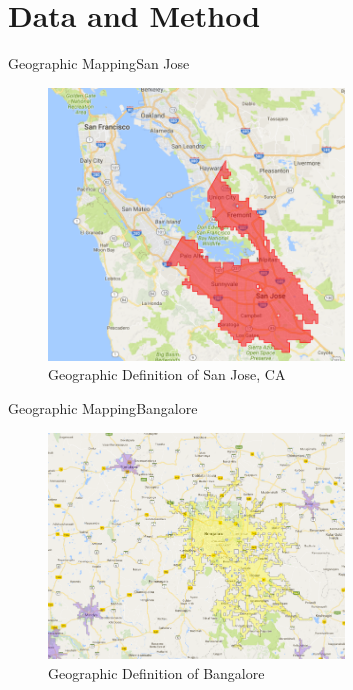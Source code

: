 \documentclass{beamer}
\begin{document}
\section{Data and Method}
\begin{frame}{Geographic Mapping}{San Jose}
\begin{figure}[h!]
\begin{centering}
  \includegraphics[width=0.7\textwidth]{SanJose}
  \caption{Geographic Definition of San Jose, CA}
   \label{fig:SanJose}
\end{centering}
\end{figure}
\end{frame}

\begin{frame}{Geographic Mapping}{Bangalore}
\begin{figure}[h!]
\begin{centering}
  \includegraphics[width=0.7\textwidth]{Bangalore}
  \caption{Geographic Definition of Bangalore}
   \label{fig:Bangalore}
\end{centering}
\end{figure}
\end{frame}
\end{document}
